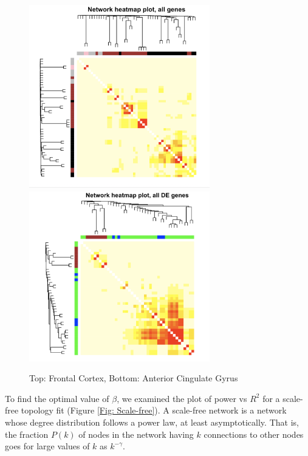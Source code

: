 \begin{figure}
    \centering
    \includegraphics[width=0.7\textwidth]{./Figures/heatmap/Heatmap_FC.png}
    \includegraphics[width=0.7\textwidth]{./Figures/heatmap/Heatmap_ACG.png}
    \caption{Top: Frontal Cortex, Bottom: Anterior Cingulate Gyrus}
    \label{Fig: heatmap}
\end{figure}

To find the optimal value of $\beta$, we examined the plot of power vs $R^2$ for a scale-free topology fit (Figure \ref{Fig: Scale-free}). A scale-free network is a network whose degree distribution follows a power law, at least asymptotically. That is, the fraction $P(k)$ of nodes in the network having $k$ connections to other nodes goes for large values of $k$ as $k^{-\gamma}$.\\

